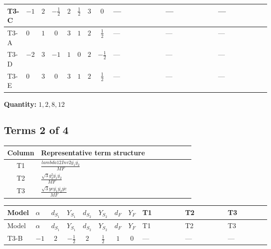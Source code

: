 \documentclass[8pt]{article}
\begin{document}
\begin{landscape}
\begin{longtable}{@{}llcccccc >{\raggedright\arraybackslash}p{0.21\linewidth} >{\raggedright\arraybackslash}p{0.21\linewidth} >{\raggedright\arraybackslash}p{0.21\linewidth}@{}}
\midrule
T3-C & $-1$ & $2$ & $-\frac{1}{2}$ & $2$ & $\frac{1}{2}$ & $3$ & $0$ & --- & --- & --- \\
\midrule
T3-A & $0$ & $1$ & $0$ & $3$ & $1$ & $2$ & $\frac{1}{2}$ & --- & --- & --- \\
\midrule
T3-D & $-2$ & $3$ & $-1$ & $1$ & $0$ & $2$ & $-\frac{1}{2}$ & --- & --- & --- \\
\midrule
T3-E & $0$ & $3$ & $0$ & $3$ & $1$ & $2$ & $\frac{1}{2}$ & --- & --- & --- \\
\midrule
\bottomrule
\end{longtable}
\clearpage
\noindent\textbf{Quantity: }$\mathrm{1,2,8,12}$\par\smallskip
\subsection*{Terms 2 of 4}
\begin{center}
\begin{tabular}{@{}c >{\raggedright\arraybackslash}p{0.82\linewidth}@{}}
\toprule
Column & Representative term structure \\
\midrule
T1 & \(\displaystyle \frac{lambda12Inv2 \overline{y_{1}} \overline{y_{2}}}{MF}\) \\
\midrule
T2 & \(\displaystyle \frac{\sqrt{3} g_{2}^{2} \overline{y_{1}} \overline{y_{2}}}{MF}\) \\
\midrule
T3 & \(\displaystyle \frac{\sqrt{3} ye \overline{y_{1}} \overline{y_{2}} \overline{ye}}{MF}\) \\
\midrule
\bottomrule
\end{tabular}
\end{center}
\smallskip
\tiny
\begin{longtable}{@{}llcccccc >{\raggedright\arraybackslash}p{0.21\linewidth} >{\raggedright\arraybackslash}p{0.21\linewidth} >{\raggedright\arraybackslash}p{0.21\linewidth}@{}}
\toprule
Model & $\alpha$ & $d_{S_1}$ & $Y_{S_1}$ & $d_{S_2}$ & $Y_{S_2}$ & $d_F$ & $Y_F$ & T1 & T2 & T3 \\
\midrule
\endfirsthead
\toprule
Model & $\alpha$ & $d_{S_1}$ & $Y_{S_1}$ & $d_{S_2}$ & $Y_{S_2}$ & $d_F$ & $Y_F$ & T1 & T2 & T3 \\
\midrule
\endhead
T3-B & $-1$ & $2$ & $-\frac{1}{2}$ & $2$ & $\frac{1}{2}$ & $1$ & $0$ & --- & --- & --- \\
\midrule

\end{longtable}
\end{landscape}
\end{document}
